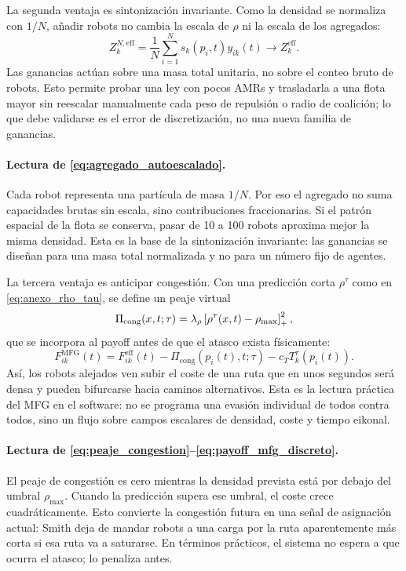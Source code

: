 La segunda ventaja es sintonización invariante. Como la densidad se normaliza con
$1/N$, añadir robots no cambia la escala de $\rho$ ni la escala de los agregados:
\begin{equation}
  Z_k^{N,\mathrm{eff}}
  =
  \frac{1}{N}\sum_{i=1}^{N}s_k(p_i,t)y_{ik}(t)
  \longrightarrow
  Z_k^{\mathrm{eff}} .
  \label{eq:agregado_autoescalado}
\end{equation}
Las ganancias actúan sobre una masa total unitaria, no sobre el conteo bruto de robots.
Esto permite probar una ley con pocos AMRs y trasladarla a una flota mayor sin reescalar
manualmente cada peso de repulsión o radio de coalición; lo que debe validarse es el
error de discretización, no una nueva familia de ganancias.

\paragraph{Lectura de \eqref{eq:agregado_autoescalado}.}
Cada robot representa una partícula de masa $1/N$. Por eso el agregado no suma
capacidades brutas sin escala, sino contribuciones fraccionarias. Si el patrón espacial
de la flota se conserva, pasar de 10 a 100 robots aproxima mejor la misma densidad. Esta
es la base de la sintonización invariante: las ganancias se diseñan para una masa total
normalizada y no para un número fijo de agentes.

La tercera ventaja es anticipar congestión. Con una predicción corta
$\rho^\tau$ como en \eqref{eq:anexo_rho_tau}, se define un peaje virtual
\begin{equation}
  \Pi_{\mathrm{cong}}(x,t;\tau)
  =
  \lambda_\rho\left[\rho^\tau(x,t)-\rho_{\max}\right]_{+}^2,
  \label{eq:peaje_congestion}
\end{equation}
que se incorpora al payoff antes de que el atasco exista físicamente:
\begin{equation}
  F_{ik}^{\mathrm{MFG}}(t)=
  F_{ik}^{\mathrm{eff}}(t)
  -\Pi_{\mathrm{cong}}(p_i(t),t;\tau)
  -c_TT_k^\tau(p_i(t)).
  \label{eq:payoff_mfg_discreto}
\end{equation}
Así, los robots alejados ven subir el coste de una ruta que en unos segundos será densa y
pueden bifurcarse hacia caminos alternativos. Esta es la lectura práctica del MFG en el
software: no se programa una evasión individual de todos contra todos, sino un flujo
sobre campos escalares de densidad, coste y tiempo eikonal.

\paragraph{Lectura de \eqref{eq:peaje_congestion}--\eqref{eq:payoff_mfg_discreto}.}
El peaje de congestión es cero mientras la densidad prevista está por debajo del umbral
$\rho_{\max}$. Cuando la predicción supera ese umbral, el coste crece cuadráticamente.
Esto convierte la congestión futura en una señal de asignación actual: Smith deja de
mandar robots a una carga por la ruta aparentemente más corta si esa ruta va a saturarse.
En términos prácticos, el sistema no espera a que ocurra el atasco; lo penaliza antes.

